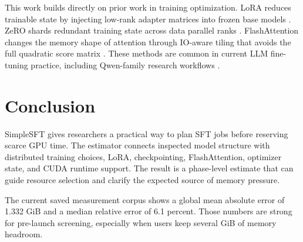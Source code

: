This work builds directly on prior work in training optimization. LoRA
reduces trainable state by injecting low-rank adapter matrices into frozen base
models \cite{hu2021lora}. ZeRO shards redundant training state across data
parallel ranks \cite{rajbhandari2020zero}. FlashAttention changes the memory
shape of attention through IO-aware tiling that avoids the full quadratic score
matrix \cite{dao2022flashattention}. These methods are common in current LLM
fine-tuning practice, including Qwen-family research workflows \cite{qwen25}.

\section{Conclusion}
SimpleSFT gives researchers a practical way to plan SFT jobs before reserving
scarce GPU time. The estimator connects inspected model structure with
distributed training choices, LoRA, checkpointing, FlashAttention, optimizer
state, and CUDA runtime support. The result is a phase-level estimate that can
guide resource selection and clarify the expected source of memory pressure.

The current saved measurement corpus shows a global mean absolute error of
1.332 GiB and a median relative error of 6.1 percent. Those numbers are strong
for pre-launch screening, especially when users keep several GiB of memory
headroom.
